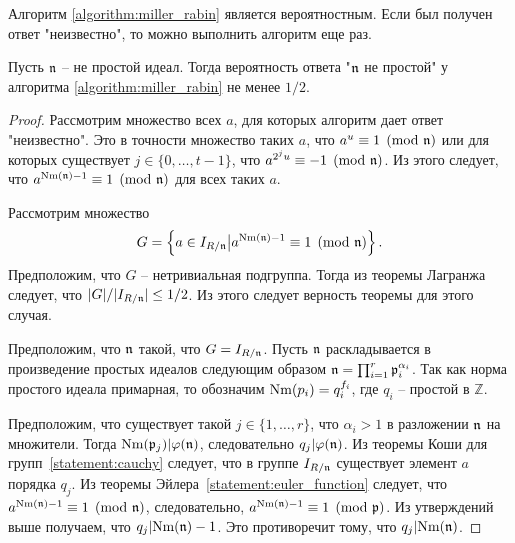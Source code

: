 \documentclass[_00_dissertation.tex]{subfiles}
\begin{document}
\begin{remark}
    Алгоритм \ref{algorithm:miller_rabin} является вероятностным.
    Если был получен ответ "неизвестно", то можно выполнить алгоритм еще раз.
\end{remark}

\begin{proposition}
    Пусть $\mathfrak{n}$ -- не простой идеал.
    Тогда вероятность ответа "$\mathfrak{n}$ не простой" у алгоритма \ref{algorithm:miller_rabin} не менее $1/2$.
\end{proposition}
\begin{proof}
    Рассмотрим множество всех $a$, для которых алгоритм дает ответ "неизвестно".
    Это в точности множество таких $a$, что $a^u \equiv 1 \pmod{\mathfrak{n}}$ или для которых существует $j \in \{0, \dots, t-1\}$, что $a^{2^{j}u} \equiv -1 \pmod{\mathfrak{n}}$.
    Из этого следует, что $a^{\textrm{Nm}(\mathfrak{n}) - 1} \equiv 1 \pmod{\mathfrak{n}}$ для всех таких $a$.

    Рассмотрим множество
    \begin{equation*}
        G = \left\{
            a \in I_{R/\mathfrak{n}} \big| a^{\textrm{Nm}(\mathfrak{n}) - 1} \equiv 1 \pmod{\mathfrak{n}}
        \right\}.
    \end{equation*}
    Предположим, что $G$ -- нетривиальная подгруппа.
    Тогда из теоремы Лагранжа следует, что $|G| / |I_{R/\mathfrak{n}}| \le 1/2$.
    Из этого следует верность теоремы для этого случая.

    Предположим, что $\mathfrak{n}$ такой, что $G = I_{R/\mathfrak{n}}$.
    Пусть $\mathfrak{n}$ раскладывается в произведение простых идеалов следующим образом $\mathfrak{n} = \prod_{i=1}^r \mathfrak{p}_i^{\alpha_i}$.
    Так как норма простого идеала примарная, то обозначим $\textrm{Nm}(p_i) = q_i^{f_i}$, где $q_i$ -- простой в $\mathbb{Z}$.

    Предположим, что существует такой $j \in \{1, \dots, r\}$, что $\alpha_i > 1$ в разложении $\mathfrak{n}$ на множители.
    Тогда $\textrm{Nm}(\mathfrak{p}_j) | \varphi(\mathfrak{n})$, следовательно $q_j | \varphi(\mathfrak{n})$.
    Из теоремы Коши для групп~\ref{statement:cauchy} следует, что в группе $I_{R/\mathfrak{n}}$ существует элемент $a$ порядка $q_j$.
    Из теоремы Эйлера~\ref{statement:euler_function} следует, что $a^{\textrm{Nm}(\mathfrak{n}) - 1} \equiv 1 \pmod{\mathfrak{n}}$, следовательно, $a^{\textrm{Nm}(\mathfrak{n}) - 1} \equiv 1 \pmod{\mathfrak{p}}$.
    Из утверждений выше получаем, что $q_j | \textrm{Nm}(\mathfrak{n}) - 1$.
    Это противоречит тому, что $q_j | \textrm{Nm}(\mathfrak{n})$.


\end{proof}
\end{document}
